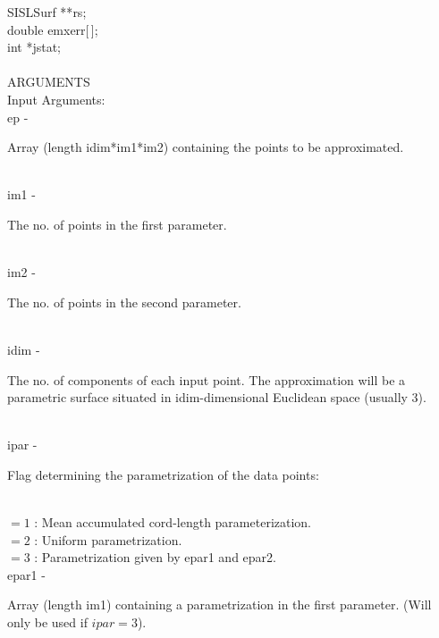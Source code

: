                 \>\>    SISLSurf    \>  **{\fov rs};\\
                \>\>    double \> {\fov emxerr}[\,];\\
                \>\>    int    \>  *{\fov jstat};\\
\\
ARGUMENTS\\
	\>Input Arguments:\\
        \>\>    {\fov ep}\> - \>  \begin{minipg2}
                     Array (length idim*im1*im2) containing the points
                  to be approximated.
                               \end{minipg2}\\[0.8ex]
        \>\>    {\fov im1}\> - \>  \begin{minipg2}
                    The no. of points in the first parameter.
                               \end{minipg2}\\[0.8ex]
        \>\>    {\fov im2}\> - \>  \begin{minipg2}
                    The no. of points in the second parameter.
                               \end{minipg2}\\[0.8ex]
        \>\>    {\fov idim}\> - \>  \begin{minipg2}
                    The no. of components of each input point.
                  The approximation will be a parametric surface
                  situated in idim-dimensional Euclidean space
                  (usually 3).
                               \end{minipg2}\\[0.8ex]
        \>\>    {\fov ipar}\> - \>  \begin{minipg2}
                     Flag determining the parametrization of the data points:
                               \end{minipg2}\\[0.8ex]
          \>\>\>\>  $= 1$  : Mean accumulated cord-length parameterization.\\
          \>\>\>\>  $= 2$  : Uniform parametrization.\\
          \>\>\>\>  $= 3$  : Parametrization given by epar1 and epar2.\\
        \>\>    {\fov epar1}\> - \>  \begin{minipg2}
                     Array (length im1) containing a parametrization
                  in the first parameter. (Will only
                  be used if $ipar=3$).
                               \end{minipg2}\\[0.8ex]
